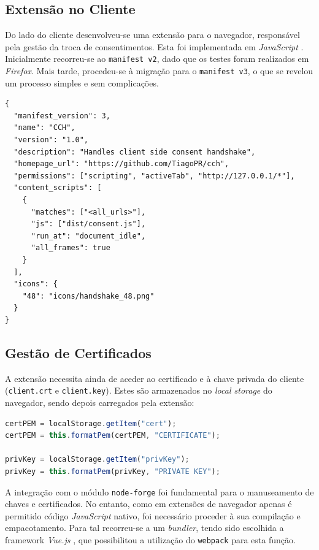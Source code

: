 \subsection{Extensão no Cliente}
Do lado do cliente desenvolveu-se uma extensão para o navegador, responsável pela gestão da troca de consentimentos. Esta foi implementada em \textit{JavaScript} \citep{MozillaBrowserExtensions}. Inicialmente recorreu-se ao \texttt{manifest v2}, dado que os testes foram realizados em \textit{Firefox}. Mais tarde, procedeu-se à migração para o \texttt{manifest v3}, o que se revelou um processo simples e sem complicações.

\begin{verbatim}
{
  "manifest_version": 3,
  "name": "CCH",
  "version": "1.0",
  "description": "Handles client side consent handshake",
  "homepage_url": "https://github.com/TiagoPR/cch",
  "permissions": ["scripting", "activeTab", "http://127.0.0.1/*"],
  "content_scripts": [
    {
      "matches": ["<all_urls>"],
      "js": ["dist/consent.js"],
      "run_at": "document_idle",
      "all_frames": true
    }
  ],
  "icons": {
    "48": "icons/handshake_48.png"
  }
}
\end{verbatim}

\subsection{Gestão de Certificados}
A extensão necessita ainda de aceder ao certificado e à chave privada do cliente (\texttt{client.crt} e \texttt{client.key}). Estes são armazenados no \textit{local storage} do navegador, sendo depois carregados pela extensão:

\begin{lstlisting}[language=Javascript]
certPEM = localStorage.getItem("cert");
certPEM = this.formatPem(certPEM, "CERTIFICATE");

privKey = localStorage.getItem("privKey");
privKey = this.formatPem(privKey, "PRIVATE KEY");
\end{lstlisting}

A integração com o módulo \texttt{node-forge} foi fundamental para o manuseamento de chaves e certificados. No entanto, como em extensões de navegador apenas é permitido código \textit{JavaScript} nativo, foi necessário proceder à sua compilação e empacotamento. Para tal recorreu-se a um \textit{bundler}, tendo sido escolhida a framework \textit{Vue.js} \citep{VueJS}, que possibilitou a utilização do \texttt{webpack} para esta função.


